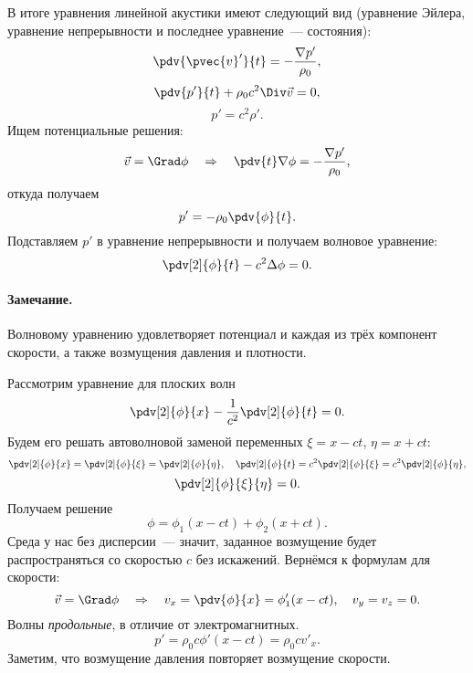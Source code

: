 В итоге уравнения линейной акустики имеют следующий вид (уравнение Эйлера, уравнение непрерывности и последнее уравнение~--- состояния):
\begin{equation}
	\pdv{\pvec{v}'}{t} = -\frac{\nabla p'}{\rho_0},
\end{equation}
\begin{equation}
    \pdv{p'}{t} + \rho_0 c^2 \Div \vec{v} = 0,
\end{equation}
\begin{equation}
	p' = c^2 \rho'.
\end{equation}
Ищем потенциальные решения:
\begin{equation}
    \vec{v} = \Grad \phi
    \quad\Rightarrow\quad
    \pdv{t} \nabla \phi = -\frac{\nabla p'}{\rho_0},
\end{equation}
откуда получаем
\begin{equation}
    p' = -\rho_0 \pdv{\phi}{t}.
\end{equation}
Подставляем $p'$ в уравнение непрерывности и получаем волновое уравнение:
\begin{equation}
    \pdv[2]{\phi}{t} - c^2 \Delta\phi = 0.
\end{equation}

\paragraph{Замечание.} Волновому уравнению удовлетворяет потенциал
и каждая из трёх компонент скорости, а также возмущения давления и плотности.

Рассмотрим уравнение для плоских волн
\begin{equation}
    \pdv[2]{\phi}{x}-\frac{1}{c^2} \pdv[2]{\phi}{t}=0.
\end{equation}
Будем его решать автоволновой заменой переменных $\xi = x-ct$, $\eta=x+ct$:
\begin{equation}
    \pdv[2]{\phi}{x} = \pdv[2]{\phi}{\xi} = \pdv[2]{\phi}{\eta}, \quad
    \pdv[2]{\phi}{t} = c^2 \pdv[2]{\phi}{\xi}=
        c^2 \pdv[2]{\phi}{\eta},
\end{equation}
\begin{equation}
    \pdv[2]{\phi}{\xi}{\eta}=0.
\end{equation}
Получаем решение
\begin{equation}
    \phi = \phi_1(x-ct)+\phi_2(x+ct).
\end{equation}
Среда у нас без дисперсии~--- значит, заданное возмущение  будет распространяться со скоростью $c$ без искажений.
Вернёмся к формулам для скорости:
\begin{equation}
    \vec{v} = \Grad\phi
    \quad\Rightarrow\quad
    v_x = \pdv{\phi}{x} = \phi'_1(x-ct), \quad
    v_y = v_z = 0.
\end{equation}
Волны \textit{продольные}, в отличие от электромагнитных.
\begin{equation}
    p' = \rho_0 c \phi' (x-ct) = \rho_{0} c v'_x.
\end{equation}
Заметим, что возмущение давления повторяет возмущение скорости.

